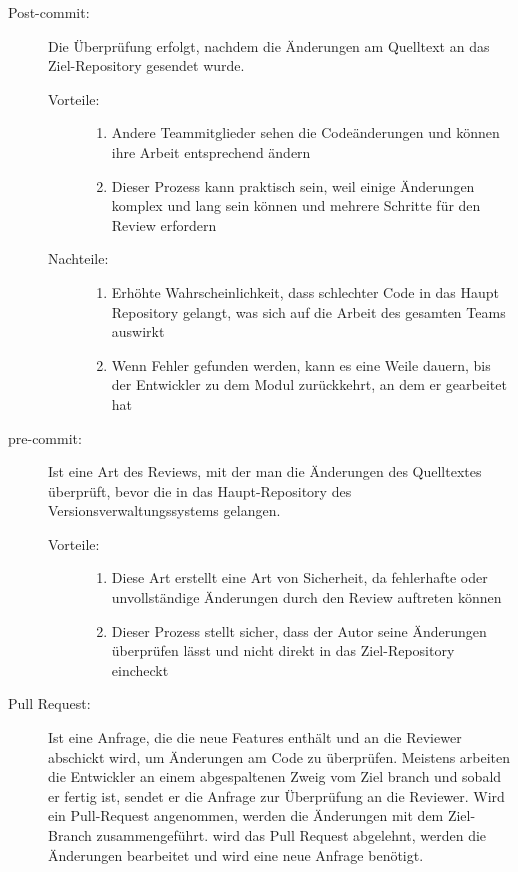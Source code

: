\begin{description}
	\item [Post-commit:]
		Die Überprüfung erfolgt, nachdem die Änderungen am Quelltext an das Ziel-Repository gesendet wurde.
		\begin{description}
			\item [Vorteile:] \hfill
			\begin{enumerate}
				\item Andere Teammitglieder sehen die Codeänderungen und können ihre Arbeit entsprechend ändern
				\item Dieser Prozess kann praktisch sein, weil einige Änderungen komplex und lang sein können und mehrere Schritte für den Review erfordern
			\end{enumerate}
			
			\item[Nachteile:] \hfill
			\begin{enumerate}
				\item Erhöhte Wahrscheinlichkeit, dass schlechter Code in das Haupt Repository gelangt, was sich auf die Arbeit des gesamten Teams auswirkt
				\item Wenn Fehler gefunden werden, kann es eine Weile dauern, bis der Entwickler zu dem Modul zurückkehrt, an dem er gearbeitet hat
			\end{enumerate}
		\end{description}
		
		
	\item [pre-commit:]
		Ist eine Art des Reviews, mit der man die Änderungen des Quelltextes überprüft, bevor die in das Haupt-Repository des Versionsverwaltungssystems gelangen.
		\begin{description}
			\item [Vorteile:] \hfill
			\begin{enumerate}
				\item Diese Art erstellt eine Art von Sicherheit, da fehlerhafte oder unvollständige Änderungen durch den Review auftreten können
				\item Dieser Prozess stellt sicher, dass der Autor seine Änderungen überprüfen lässt und nicht direkt in das Ziel-Repository eincheckt
			\end{enumerate}
		\end{description}
		
	\item [Pull Request:]
		Ist eine Anfrage, die die neue Features enthält und an die Reviewer abschickt wird, um Änderungen am Code zu überprüfen. Meistens arbeiten die Entwickler an einem abgespaltenen 			Zweig vom Ziel branch und sobald er fertig ist, sendet er die Anfrage zur Überprüfung an die Reviewer. Wird ein Pull-Request angenommen, werden die Änderungen mit dem Ziel- 				Branch zusammengeführt. wird das Pull Request abgelehnt, werden die Änderungen bearbeitet und wird eine neue Anfrage benötigt.
	

\end{description}
